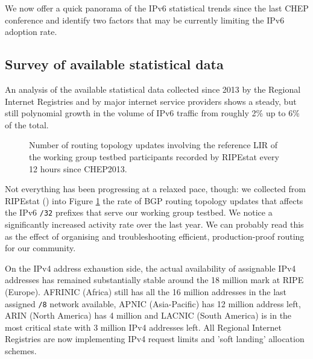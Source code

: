 We now offer a quick panorama of the IPv6 statistical trends since the last
CHEP conference and identify two factors that may be currently limiting 
the IPv6 adoption rate. 
\subsection{Survey of available statistical data}
An analysis of the available statistical data collected since 2013
by the Regional Internet Registries \cite{ripeipv6,arinstat,apnicstat,afrinicipv6,lacnicipc6} and by major internet
service providers \cite{akamaistats,googlestats} shows a steady, but
still polynomial growth in the volume of IPv6 traffic from roughly 
2\% up to 6\% of the total. 
\begin{figure}
\centering
\def\svgwidth{\columnwidth}

\caption{Number of routing topology updates involving the reference LIR of the working group testbed participants recorded by RIPEstat \cite{ripestat} every 12 hours since CHEP2013.}
\label{fig:bgpupdates}
\end{figure}
Not everything has been progressing at a relaxed pace, though: we collected from RIPEstat (\cite{ripestat}) into Figure \ref{fig:bgpupdates} the
rate of BGP routing topology updates that affects
the IPv6 {\tt/32} prefixes that serve our
working group testbed. We notice a significantly increased activity rate over the
last year. We can probably read this as the effect of organising and troubleshooting efficient, production-proof routing for our community.\par
On the IPv4 address exhaustion side, the actual availability of
assignable IPv4 addresses has remained substantially stable around the 18 million mark at RIPE (Europe). AFRINIC (Africa) still has all the 16 million addresses in the last assigned {\tt /8} network available, APNIC (Asia-Pacific) has 12 million address left, ARIN (North America) has 4 million and LACNIC (South America) is in
the most critical state with 3 million IPv4 addresses left.
All Regional Internet Registries are
now implementing IPv4 request limits and 'soft landing' allocation schemes.
